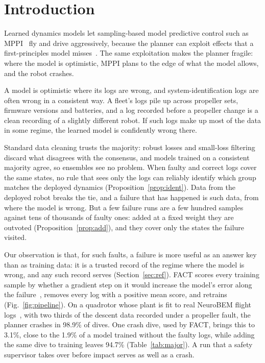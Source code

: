 \documentclass[preprint,12pt]{elsarticle}
\newcommand{\method}{FACT}
\begin{document}
\linenumbers

\section{Introduction}\label{sec:intro}

Learned dynamics models let sampling-based model predictive control such as MPPI~\citep{williams2017mppi,williams2017itmpc} fly and drive aggressively, because the planner can exploit effects that a first-principles model misses~\citep{nagabandi2018neural,chua2018pets,shi2019neurallander,torrente2021datadriven,bauersfeld2021neurobem,oconnell2022neuralfly,salzmann2023neuralmpc}. The same exploitation makes the planner fragile: where the model is optimistic, MPPI plans to the edge of what the model allows, and the robot crashes.

A model is optimistic where its logs are wrong, and system-identification logs are often wrong in a consistent way. A fleet's logs pile up across propeller sets, firmware versions and batteries, and a log recorded before a propeller change is a clean recording of a slightly different robot. If such logs make up most of the data in some regime, the learned model is confidently wrong there.

Standard data cleaning trusts the majority: robust losses and small-loss filtering discard what disagrees with the consensus, and models trained on a consistent majority agree, so ensembles see no problem. When faulty and correct logs cover the same states, no rule that sees only the logs can reliably identify which group matches the deployed dynamics (Proposition~\ref{prop:ident}). Data from the deployed robot breaks the tie, and a failure that has happened is such data, from where the model is wrong. But a few failure runs are a few hundred samples against tens of thousands of faulty ones: added at a fixed weight they are outvoted (Proposition~\ref{prop:add}), and they cover only the states the failure visited.

Our observation is that, for such faults, a failure is more useful as an answer key than as training data: it is a trusted record of the regime where the model is wrong, and any such record serves (Section~\ref{sec:ref}). \method{} scores every training sample by whether a gradient step on it would increase the model's error along the failure~\citep{pruthi2020tracin}, removes every log with a positive mean score, and retrains (Fig.~\ref{fig:pipeline}). On a quadrotor whose plant is fit to real NeuroBEM flight logs~\citep{bauersfeld2021neurobem}, with two thirds of the descent data recorded under a propeller fault, the planner crashes in 98.9\% of dives. One crash dive, used by \method{}, brings this to 3.1\%, close to the 1.9\% of a model trained without the faulty logs, while adding the same dive to training leaves 94.7\% (Table~\ref{tab:major}). A run that a safety supervisor takes over before impact serves as well as a crash.
\end{document}
